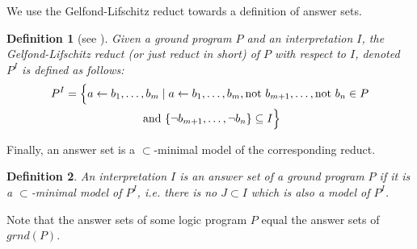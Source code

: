 \documentclass{vutinfth} %
\newtheorem{definition}{Definition}[chapter]
\newcommand{\fail}{\mathrm{not } \ \xspace}
\newcommand{\from}{\ensuremath{\leftarrow}}
\begin{document}
We use the Gelfond-Lifschitz reduct towards a definition of answer sets.

\begin{definition}[see {\cite[Section 2]{stable}}]
	Given a ground program $P$ and an interpretation $I$, the \emph{Gelfond-Lifschitz reduct} (or just \emph{reduct} in short) of $P$ with respect to $I$, denoted $P^I$ is defined as follows:
\begin{multline*}
P^I = \Bigl\{ a \from b_1, \ldots , b_m \mid a \from b_1, \ldots, b_m, \fail b_{m+1}, \ldots, \fail b_n \in P\\ \text{ and } \{ \neg b_{m+1} , \ldots , \neg b_n \} \subseteq I \Bigr\}
\end{multline*}
\end{definition}

Finally, an answer set is a $\subset$-minimal model of the corresponding reduct.

\begin{definition}
An interpretation $I$ is an \emph{answer set} of a ground program $P$ if it is a $\subset$-minimal model of $P^I$, i.e. there is no $J \subset I$ which is also a model of $P^I$.
\end{definition}

Note that the answer sets of some logic program $P$ equal the answer sets of $grnd(P)$.
\end{document}
